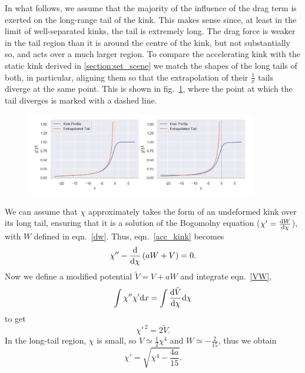 \documentclass[11pt, oneside]{article}  	%
\numberwithin{equation}{section}
\newcommand{\drv}{\ensuremath{\textup{d}}}
\begin{document}
In what follows, we assume that the majority of the influence of the drag term is exerted on the long-range tail of the kink. This makes sense since, at least in the limit of well-separated kinks, the tail is extremely long. The drag force is weaker in the tail region than it is around the centre of the kink, but not substantially so, and acts over a much larger region. To compare the accelerating kink with the static kink derived in \textsection \ref{section:set_scene} we match the shapes of the long tails of both, in particular, aligning them so that the extrapolation of their $\frac{1}{x}$ tails diverge at the same point. This is shown in fig.~\ref{tails}, where the point at which the tail diverges is marked with a dashed line.\par
\begin{figure}
    \centering
    \includegraphics[width=0.9\textwidth]{asym_tails.png}
     \label{tails}
\end{figure}
We can assume that $\chi$ approximately takes the form of an undeformed kink over its long tail, ensuring that it is a solution of the Bogomolny equation ($\chi' = \frac{\drv W }{\drv \chi}$), with $W$ defined in eqn.~\ref{dw}. Thus, eqn.~\ref{acc_kink} becomes
\begin{equation}\label{VW}
    \chi'' -\frac{\drv}{\drv \chi}\left ( aW + V \right ) =0.
\end{equation}
Now we define a modified potential $\tilde{V} = V +aW$ and integrate eqn.~\ref{VW},
\begin{equation}
    \int \chi'' \chi' \drv x = \int \frac{\drv \tilde{V}}{\drv \chi} \drv \chi
\end{equation}
to get
\begin{equation}
    \chi'^{\,2} = 2 \tilde{V}.
\end{equation}
In the long-tail region, $\chi$ is small, so $V\simeq \frac{1}{2}\chi^4$ and $W\simeq -\frac{2}{15}$, thus we obtain
\begin{equation}\label{chi_prime}
    \chi' = \sqrt{\chi^4 - \frac{4a}{15}}.
\end{equation}
\end{document}
